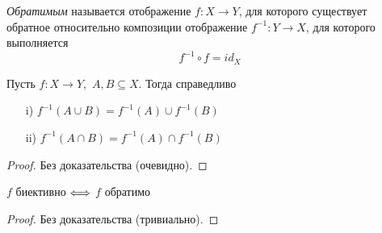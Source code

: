 \begin{definition}
    \textit{Обратимым} называется отображение $f \colon X \to Y$, для которого
    существует обратное относительно композиции отображение
    $f^{-1} \colon Y \to X$, для которого выполняется
\[
    f^{-1} \circ f = id_X
\]
\end{definition}

\begin{theorem}
    Пусть $f \colon X \to Y$, \,$A, B \subseteq X$. Тогда справедливо
    \begin{enumerate}
        \item[i)] $f^{-1}(A \cup B) = f^{-1}(A) \cup f^{-1}(B)$
        \item[ii)] $f^{-1}(A \cap B) = f^{-1}(A) \cap f^{-1}(B)$
    \end{enumerate}
\end{theorem}
\begin{proof}
    Без доказательства (очевидно).
\end{proof}

\begin{theorem}
    $f$ биективно $\Longleftrightarrow$ $f$ обратимо
\end{theorem}
\begin{proof}
    Без доказательства (тривиально).
\end{proof}

\newpage


